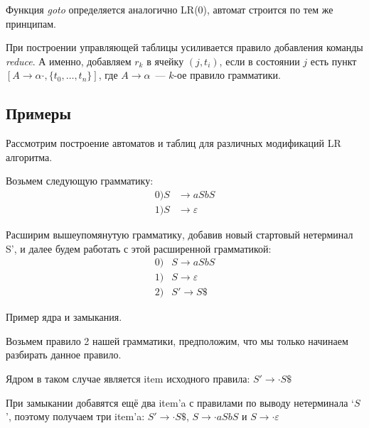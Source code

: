 Функция \textit{goto} определяется аналогично LR(0), автомат строится по тем же принципам.

При построении управляющей таблицы усиливается правило добавления команды \textit{reduce}.
А именно, добавляем $r_k$ в ячейку $(j,t_i)$, если в состоянии $j$ есть пункт $[A \to \alpha \cdot, \{t_0, \dots, t_n\}]$, где $A \to \alpha$~--- $k$-ое правило грамматики.

\subsection{Примеры}

Рассмотрим построение автоматов и таблиц для различных модификаций LR алгоритма.

Возьмем следующую грамматику:
\begin{align*}
0) S & \rightarrow a S b S \\
1) S & \rightarrow \varepsilon
\end{align*}

Расширим вышеупомянутую грамматику, добавив новый стартовый нетерминал S', и далее будем работать с этой расширенной грамматикой:
\begin{align*}
0)& S \rightarrow a S b S \\
1)& S \rightarrow \varepsilon \\
2)& S' \rightarrow S \$
\end{align*}


\begin{example}
Пример ядра и замыкания.

Возьмем правило 2 нашей грамматики, предположим, что мы только начинаем разбирать данное правило.

Ядром в таком случае является item исходного правила: $S' \rightarrow \cdot S \$$

При замыкании добавятся ещё два item'a с правилами по выводу нетерминала `$S$', поэтому получаем три item'a: $S' \rightarrow \cdot S\$$, $S \rightarrow \cdot aSbS$ и $S \rightarrow \cdot \varepsilon$
\end{example}

